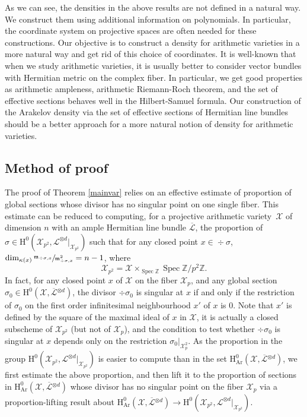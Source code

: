 \documentclass[JEP,XML,SOM,Unicode,published]{cedram}
\theoremstyle{plain}
\theoremstyle{definition}
\newcommand{\ho}{\mathrm{H}}
\newcommand{\m}{\mathfrak{m}}
\newcommand{\X}{\mathcal{X}}
\newcommand{\Li}{\overline{\mathcal{L}}{}}
\newcommand{\li}{\mathcal{L}}
\newcommand{\Z}{\mathbb{Z}}
\DeclareMathOperator{\Spec}{Spec}
\begin{document}
As we can see, the densities in the above results are not defined in a natural way. We construct them using additional information on polynomials. In particular, the coordinate system on projective spaces are often needed for these constructions. Our objective is to construct a density for arithmetic varieties in a more natural way and get rid of this choice of coordinates. It is well-known that when we study arithmetic varieties, it is usually better to consider vector bundles with Hermitian metric on the complex fiber. In particular, we get good properties as arithmetic ampleness, arithmetic Riemann-Roch theorem, and the set of effective sections behaves well in the Hilbert-Samuel formula. Our construction of the Arakelov density via the set of effective sections of Hermitian line bundles should be a better approach for a more natural notion of density for arithmetic varieties.

\subsection{Method of proof}
The proof of Theorem \ref{mainvar} relies on an effective \hbox{estimate} of proportion of global sections whose divisor has no singular point on one \hbox{single} fiber. This estimate can be reduced to computing, for a projective arithmetic variety~$\X$ of dimension $n$ with an ample Hermitian line bundle $\Li$, the proportion of $\sigma\!\in\! \ho^0(\X_{p^2}, \li^{\otimes d}|_{\X_{p^2}})$ such that for any closed point $x\!\in\!\div \sigma$, $\dim_{\kappa(x)}\sfrac{\m_{\div \sigma,x}}{\m^2_{\div \sigma, x}}=n-1$, where
\[
\X_{p^2}=\X\times_{\Spec \Z}\Spec \Z/p^2\Z.
\]
In fact, for any closed point $x$ of $\X$ on the fiber $\X_p$, and any global section $\sigma_0\in \ho^0(\X, \Li^{\otimes d})$, the divisor $\div \sigma_0$ is singular at $x$ if and only if the restriction of $\sigma_0$ on the first order infinitesimal neighbourhood $x'$ of $x$ is $0$. Note that $x'$ is defined by the square of the maximal ideal of $x$ in $\X$, it is actually a closed subscheme of $\X_{p^2}$ (but not of $\X_p$), and the condition to test whether $\div \sigma_0$ is singular at $x$ depends only on the restriction $\sigma_0|_{\X_p^2}$. As the proportion in the group $\ho^0(\X_{p^2}, \li^{\otimes d}|_{\X_{p^2}})$ is easier to compute than in the set $\ho^0_{\mathrm{Ar}}(\X, \Li^{\otimes d})$, we first estimate the above proportion, and then lift it to the proportion of sections in $\ho^0_{\mathrm{Ar}}(\X, \Li^{\otimes d})$ whose divisor has no singular point on the fiber $\X_p$ via a proportion-lifting result about $\ho^0_{\mathrm{Ar}}(\X, \Li^{\otimes d})\to \ho^0(\X_{p^2}, \li^{\otimes d}|_{\X_{p^2}})$.
\end{document}
